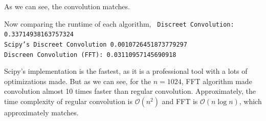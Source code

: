 \documentclass[12pt]{article}
\begin{document}
As we can see, the convolution matches. 


Now comparing the runtime of each algorithm,
\texttt{
Discreet Convolution:  0.33714938163757324\\
Scipy's Discreet Convolution 0.0010726451873779297\\
Discreen Convolution (FFT):  0.03110957145690918\\
}

Scipy's implementation is the fastest, as it is a professional tool with a lots of optimizations made. But as we can see, for the $n=1024$, FFT algorithm made convolution almost 10 times faster than regular convolution. Approximately, the time complexity of regular convolution is $\mathcal{O}(n^2)$ and FFT is $\mathcal{O}(n\log n)$, which  approximately matches.
\end{document}
